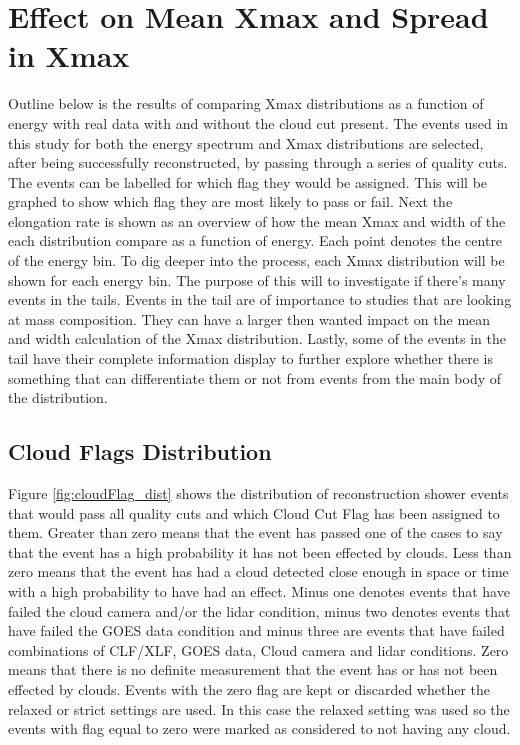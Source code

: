 \section{Effect on Mean Xmax and Spread in Xmax}

%
%
%

Outline below is the results of comparing Xmax distributions as a function of energy with real data with and without the cloud cut present. The events used in this study for both the energy spectrum and Xmax distributions are selected, after being successfully reconstructed, by passing through a series of quality cuts. The events can be labelled for which flag they would be assigned. This will be graphed to show which flag they are most likely to pass or fail. Next the elongation rate is shown as an overview of how the mean Xmax and width of the each distribution compare as a function of energy. Each point denotes the centre of the energy bin. To dig deeper into the process, each Xmax distribution will be shown for each energy bin. The purpose of this will to investigate if there's many events in the tails. Events in the tail are of importance to studies that are looking at mass composition. They can have a larger then wanted impact on the mean and width calculation of the Xmax distribution. Lastly, some of the events in the tail have their complete information display to further explore whether there is something that can differentiate them or not from events from the main body of the distribution.

\subsection{Cloud Flags Distribution}

Figure \ref{fig:cloudFlag_dist} shows the distribution of reconstruction shower events that would pass all quality cuts and which Cloud Cut Flag has been assigned to them. Greater than zero means that the event has passed one of the cases to say that the event has a high probability it has not been effected by clouds. Less than zero means that the event has had a cloud detected close enough in space or time with a high probability to have had an effect. Minus one denotes events that have failed the cloud camera and/or the lidar condition, minus two denotes events that have failed the GOES data condition and minus three are events that have failed combinations of CLF/XLF, GOES data, Cloud camera and lidar conditions. Zero means that there is no definite measurement that the event has or has not been effected by clouds. Events with the zero flag are kept or discarded whether the relaxed or strict settings are used. In this case the relaxed setting was used so the events with flag equal to zero were marked as considered to not having any cloud.

